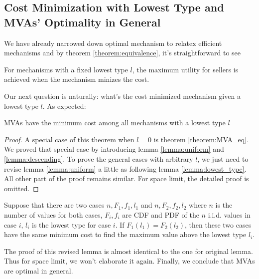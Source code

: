 \subsection{Cost Minimization with Lowest Type and MVAs' Optimality in General}

We have already narrowed down optimal mechanism to
relatex efficient mechanisms and by theorem \ref{theorem:equivalence},
it's straightforward to see

\begin{corollary}

For mechanisms with a fixed lowest type $l$, the maximum utility for sellers is
achieved when the mechanism minizes the cost.

\end{corollary}

Our next question is naturally: what's the cost minimized mechanism
given a lowest type $l$. As expected:

\begin{theorem}

MVAs have the minimum cost among all mechanisms with a lowest type $l$

\end{theorem}

\begin{proof}
A special case of this theorem when $l = 0$ is theorem \ref{theorem:MVA_eq}.
We proved that special case by introducing lemma \ref{lemma:uniform} and
\ref{lemma:descending}. To prove the general cases with arbitrary $l$, we just
need to revise lemma \ref{lemma:uniform} a little as following lemma
\ref{lemma:lowest_type}. All other part of the proof remains similar. For space
limit, the detailed proof is omitted.
\end{proof}

\begin{lemma}\label{lemma:lowest_type}
Suppose that there are two cases $n, F_1, f_1, l_1$ and $n, F_2, f_2, l_2$
where $n$ is the number of values for both cases, $F_i, f_i$ are CDF and PDF
of the $n$ i.i.d. values in case $i$, $l_i$ is the lowest type for case $i$.
If $F_1(l_1) = F_2(l_2)$, then these two cases have the same minimum cost
to find the maximum value above the lowest type $l_i$.
\end{lemma}

The proof of this revised lemma is almost identical to the one for original
lemma. Thus for space limit, we won't elaborate it again. Finally, we conclude
that MVAs are optimal in general.

